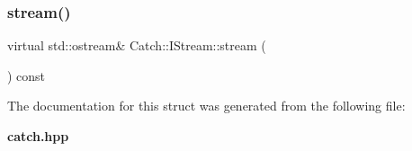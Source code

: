 \subsubsection{stream()}
{\footnotesize\ttfamily virtual std\+::ostream\& Catch\+::\+I\+Stream\+::stream (\begin{DoxyParamCaption}{ }\end{DoxyParamCaption}) const\hspace{0.3cm}{\ttfamily [pure virtual]}}



The documentation for this struct was generated from the following file\+:\begin{DoxyCompactItemize}
\item 
\textbf{ catch.\+hpp}\end{DoxyCompactItemize}
